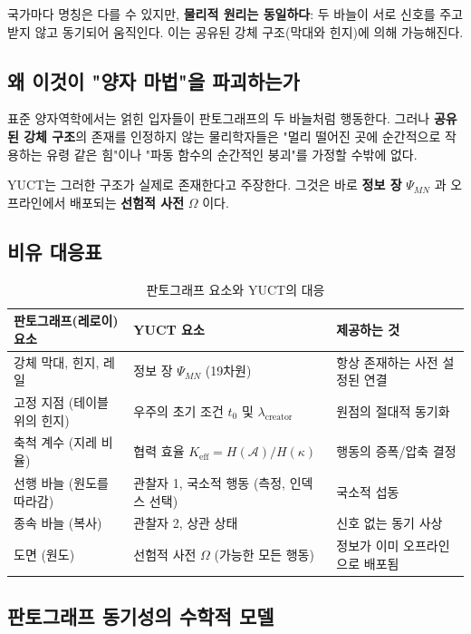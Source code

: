 \documentclass[12pt,a4paper]{article}
\begin{document}
	국가마다 명칭은 다를 수 있지만, \textbf{물리적 원리는 동일하다}: 두 바늘이 서로 신호를 주고받지 않고 동기되어 움직인다. 이는 공유된 강체 구조(막대와 힌지)에 의해 가능해진다.
	
	\subsection{왜 이것이 "양자 마법"을 파괴하는가}
	
	표준 양자역학에서는 얽힌 입자들이 판토그래프의 두 바늘처럼 행동한다. 그러나 \textbf{공유된 강체 구조}의 존재를 인정하지 않는 물리학자들은 "멀리 떨어진 곳에 순간적으로 작용하는 유령 같은 힘"이나 "파동 함수의 순간적인 붕괴"를 가정할 수밖에 없다.
	
	YUCT는 그러한 구조가 실제로 존재한다고 주장한다. 그것은 바로 \textbf{정보 장} \(\Psi_{MN}\) 과 오프라인에서 배포되는 \textbf{선험적 사전} \(\Omega\) 이다.
	
	\subsection{비유 대응표}
	
	\begin{table}[htbp]
		\centering
		\caption{판토그래프 요소와 YUCT의 대응}
		\label{tab:pantograf}
		\begin{tabular}{|p{3.5cm}|p{3.5cm}|p{5.5cm}|}
			\hline
			\textbf{판토그래프(레로이) 요소} & \textbf{YUCT 요소} & \textbf{제공하는 것} \\
			\hline
			강체 막대, 힌지, 레일 & 정보 장 \(\Psi_{MN}\) (19차원) & 항상 존재하는 사전 설정된 연결 \\
			\hline
			고정 지점 (테이블 위의 힌지) & 우주의 초기 조건 \(t_0\) 및 \(\lambda_{\mathrm{creator}}\) & 원점의 절대적 동기화 \\
			\hline
			축척 계수 (지레 비율) & 협력 효율 \(K_{\mathrm{eff}} = H(\mathcal{A})/H(\kappa)\) & 행동의 증폭/압축 결정 \\
			\hline
			선행 바늘 (원도를 따라감) & 관찰자 1, 국소적 행동 (측정, 인덱스 선택) & 국소적 섭동 \\
			\hline
			종속 바늘 (복사) & 관찰자 2, 상관 상태 & 신호 없는 동기 사상 \\
			\hline
			도면 (원도) & 선험적 사전 \(\Omega\) (가능한 모든 행동) & 정보가 이미 오프라인으로 배포됨 \\
			\hline
		\end{tabular}
	\end{table}
	
	\subsection{판토그래프 동기성의 수학적 모델}
	
\end{document}
